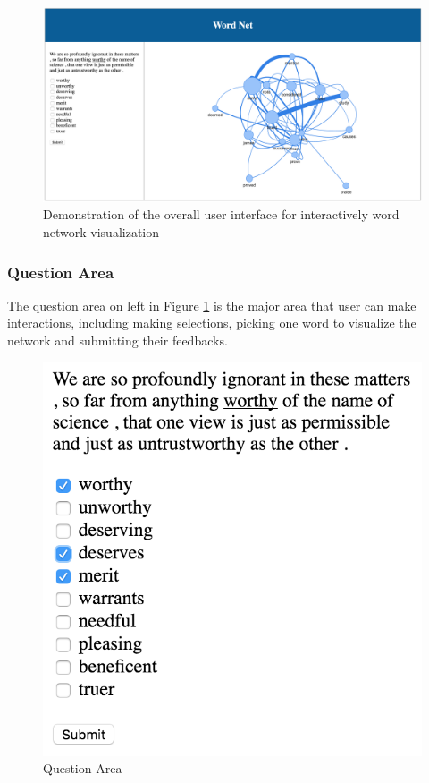 \begin{figure}[h]
\centering
\includegraphics[width=0.95\linewidth]{figure/net_demo}
\caption{Demonstration of the overall user interface for interactively word network visualization}
\label{fig:net_demo}
\end{figure}


\subsubsection{Question Area}

The question area on left in Figure \ref{fig:net_demo} is the major area that user can make interactions, including making selections, picking one word to visualize the network and submitting their feedbacks. 

\begin{figure}[h]
\centering
\includegraphics[width=0.8\linewidth]{figure/qs_demo}
\caption{Question Area}
\label{fig:qs_demo}
\end{figure}


